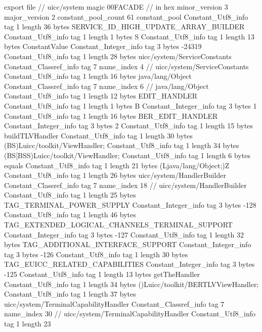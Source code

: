 export file {		// uicc/system
	magic	00FACADE		 // in hex
	minor_version	3
	major_version	2
	constant_pool_count	61
	constant_pool {
		Constant_Utf8_info {
			tag	1
			length	36
			bytes	SERVICE_ID_HIGH_UPDATE_ARRAY_BUILDER
		}
		Constant_Utf8_info {
			tag	1
			length	1
			bytes	S
		}
		Constant_Utf8_info {
			tag	1
			length	13
			bytes	ConstantValue
		}
		Constant_Integer_info {
			tag	3
			bytes	-24319
		}
		Constant_Utf8_info {
			tag	1
			length	28
			bytes	uicc/system/ServiceConstants
		}
		Constant_Classref_info {
			tag	7
			name_index	4		// uicc/system/ServiceConstants
		}
		Constant_Utf8_info {
			tag	1
			length	16
			bytes	java/lang/Object
		}
		Constant_Classref_info {
			tag	7
			name_index	6		// java/lang/Object
		}
		Constant_Utf8_info {
			tag	1
			length	12
			bytes	EDIT_HANDLER
		}
		Constant_Utf8_info {
			tag	1
			length	1
			bytes	B
		}
		Constant_Integer_info {
			tag	3
			bytes	1
		}
		Constant_Utf8_info {
			tag	1
			length	16
			bytes	BER_EDIT_HANDLER
		}
		Constant_Integer_info {
			tag	3
			bytes	2
		}
		Constant_Utf8_info {
			tag	1
			length	15
			bytes	buildTLVHandler
		}
		Constant_Utf8_info {
			tag	1
			length	30
			bytes	(BS)Luicc/toolkit/ViewHandler;
		}
		Constant_Utf8_info {
			tag	1
			length	34
			bytes	(BS[BSS)Luicc/toolkit/ViewHandler;
		}
		Constant_Utf8_info {
			tag	1
			length	6
			bytes	equals
		}
		Constant_Utf8_info {
			tag	1
			length	21
			bytes	(Ljava/lang/Object;)Z
		}
		Constant_Utf8_info {
			tag	1
			length	26
			bytes	uicc/system/HandlerBuilder
		}
		Constant_Classref_info {
			tag	7
			name_index	18		// uicc/system/HandlerBuilder
		}
		Constant_Utf8_info {
			tag	1
			length	25
			bytes	TAG_TERMINAL_POWER_SUPPLY
		}
		Constant_Integer_info {
			tag	3
			bytes	-128
		}
		Constant_Utf8_info {
			tag	1
			length	46
			bytes	TAG_EXTENDED_LOGICAL_CHANNELS_TERMINAL_SUPPORT
		}
		Constant_Integer_info {
			tag	3
			bytes	-127
		}
		Constant_Utf8_info {
			tag	1
			length	32
			bytes	TAG_ADDITIONAL_INTERFACE_SUPPORT
		}
		Constant_Integer_info {
			tag	3
			bytes	-126
		}
		Constant_Utf8_info {
			tag	1
			length	30
			bytes	TAG_EUICC_RELATED_CAPABILITIES
		}
		Constant_Integer_info {
			tag	3
			bytes	-125
		}
		Constant_Utf8_info {
			tag	1
			length	13
			bytes	getTheHandler
		}
		Constant_Utf8_info {
			tag	1
			length	34
			bytes	()Luicc/toolkit/BERTLVViewHandler;
		}
		Constant_Utf8_info {
			tag	1
			length	37
			bytes	uicc/system/TerminalCapabilityHandler
		}
		Constant_Classref_info {
			tag	7
			name_index	30		// uicc/system/TerminalCapabilityHandler
		}
		Constant_Utf8_info {
			tag	1
			length	23
}}}
